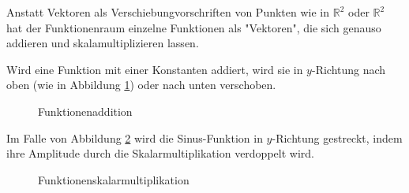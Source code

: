 Anstatt Vektoren als Verschiebungvorschriften von Punkten wie in $\mathbb{R}^2$ oder $\mathbb{R}^2$ hat der Funktionenraum einzelne Funktionen als "Vektoren", die sich genauso addieren und skalamultiplizieren lassen.
\newpage
\begin{example}
Wird eine Funktion mit einer Konstanten addiert, wird sie in $y$-Richtung nach oben (wie in Abbildung \ref{fig:fadd}) oder nach unten verschoben.
\end{example}
\begin{figure}[h]
\begin{minipage}[h]{.5\textwidth}
\end{minipage}
\hfil
\begin{minipage}[h]{.5\textwidth}
\end{minipage}
\caption{Funktionenaddition}
\label{fig:fadd}
\end{figure}

\begin{example}
Im Falle von Abbildung \ref{fig:fskl} wird die Sinus-Funktion in $y$-Richtung gestreckt, indem ihre Amplitude durch die Skalarmultiplikation verdoppelt wird.
\end{example}
\begin{figure}[h]
\centering
{}
\caption{Funktionenskalarmultiplikation}
\label{fig:fskl}
\end{figure}

